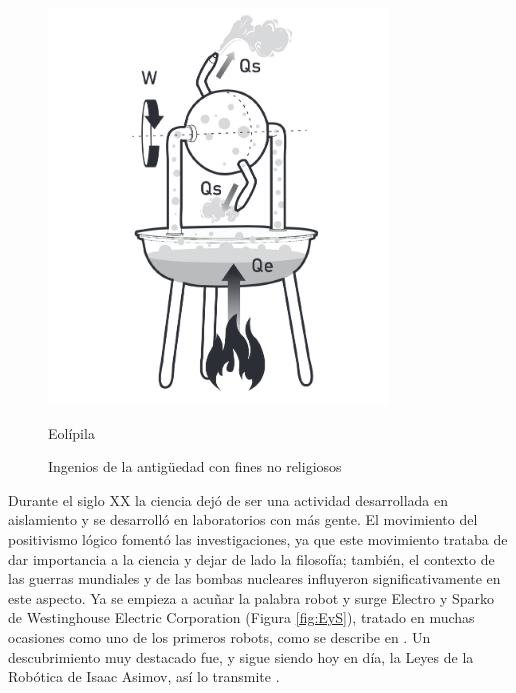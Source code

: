 \begin{figure}[ht!]
\begin{minipage}{0.3\linewidth}
		\includegraphics[width=\linewidth]{figs/eolipila.png}
		\caption*{\centering Eolípila} %
	\end{minipage}
	\caption{Ingenios de la antigüedad con fines no religiosos}
    \label{fig:ancient}
    \end{figure}

Durante el siglo XX la ciencia dejó de ser una actividad desarrollada en aislamiento y se desarrolló en laboratorios con más gente. El movimiento del positivismo lógico fomentó las investigaciones, ya que este movimiento trataba de dar importancia a la ciencia y dejar de lado la filosofía; también, el contexto de las guerras mundiales y de las bombas nucleares influyeron significativamente en este aspecto. Ya se empieza a acuñar la palabra robot y surge Electro y Sparko de Westinghouse Electric Corporation (Figura \ref{fig:EyS}), tratado en muchas ocasiones como uno de los primeros robots, como se describe en \cite{bidaudrobots}. Un descubrimiento muy destacado fue, y sigue siendo hoy en día, la Leyes de la Robótica de Isaac Asimov, así lo transmite \cite{barcelo2004nuevo}.\\


